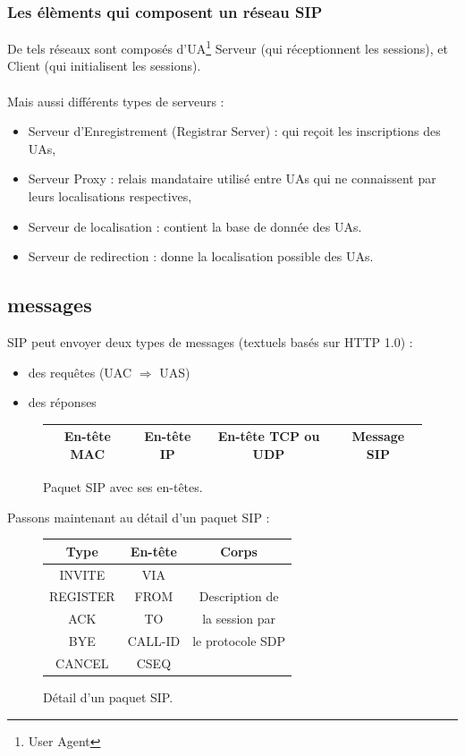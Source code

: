 \documentclass[12pt,a4paper,notitlepage]{article}
\begin{document}
\subsubsection{Les élèments qui composent un réseau SIP}
De tels réseaux sont composés d'UA\footnote{User Agent} Serveur (qui réceptionnent les sessions), et Client (qui initialisent les sessions).
\paragraph{}Mais aussi différents types de serveurs :
\begin{itemize}
\item  Serveur d'Enregistrement (Registrar Server) : qui reçoit les inscriptions des UAs,
\item Serveur Proxy : relais mandataire utilisé entre UAs qui ne connaissent par leurs localisations respectives,
\item Serveur de localisation : contient la base de donnée des UAs.
\item Serveur de redirection : donne la localisation possible des UAs.
\end{itemize}

\subsection{messages}
SIP peut envoyer deux types de messages (textuels basés sur HTTP 1.0) :
\begin{itemize}
\item des requêtes (UAC  $\Rightarrow$ UAS)
\item des réponses
\end{itemize}

\begin{figure}[h!]
	\begin{center}
		\begin{tabular}{|c|c|c|c|}
  		 \hline
  			  \rowcolor{gris} En-tête MAC & En-tête IP & En-tête TCP ou UDP & Message SIP\\
   		 \hline
  		 \end{tabular}
		 \caption{Paquet SIP avec ses en-têtes.}
 	\end{center}
 \end{figure}
 Passons maintenant au détail d'un paquet SIP :
\begin{figure}[h!]
	\begin{center}
		\begin{tabular}{|c|c|c|}
  		 \hline
  			  \rowcolor{bleup} Type & En-tête & Corps\\
   		 \hline
		 	INVITE & VIA   &    \\
			REGISTER & FROM & Description de  \\
			ACK &  TO &  la session par \\
			BYE &   CALL-ID  &   le protocole SDP   \\
			CANCEL &   CSEQ &  \\
		 \hline
  		 \end{tabular} 
		 \caption{Détail d'un paquet SIP.}
 	\end{center}
 \end{figure}
\end{document}
